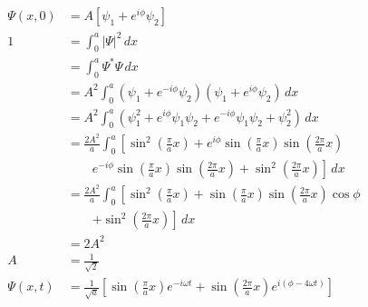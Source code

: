 \documentclass{article}
\begin{document}
\begin{align*}
  \Psi(x, 0) & = A [\psi_1 + e^{i \phi} \psi_2]                                                                                                                                       \\
  1          & = \int_0^a |\Psi|^2 \,d x                                                                                                                                              \\
             & = \int_0^a \Psi^* \Psi \,d x                                                                                                                                           \\
             & = A^2 \int_0^a (\psi_1 + e^{-i \phi} \psi_2) (\psi_1 + e^{i \phi} \psi_2) \,d x                                                                                        \\
             & = A^2 \int_0^a (\psi_1^2 + e^{i \phi} \psi_1 \psi_2 + e^{-i \phi} \psi_1 \psi_2 + \psi_2^2) \,d x                                                                      \\
             & = \frac{2 A^2}{a} \int_0^a \left[ \sin^2 \left( \frac{\pi}{a} x \right) + e^{i \phi} \sin \left( \frac{\pi}{a} x \right) \sin \left( \frac{2 \pi}{a} x \right) \right. \\
             & \qquad \left. e^{-i \phi} \sin \left( \frac{\pi}{a} x \right) \sin \left( \frac{2 \pi}{a} x \right) + \sin^2 \left( \frac{2 \pi}{a} x \right) \right] \,d x            \\
             & = \frac{2 A^2}{a} \int_0^a \left[ \sin^2 \left( \frac{\pi}{a} x \right) + \sin \left( \frac{\pi}{a} x \right) \sin \left( \frac{2 \pi}{a} x \right) \cos \phi \right.  \\
             & \qquad \left. + \sin^2 \left( \frac{2 \pi}{a} x \right) \right] \,d x                                                                                                  \\
             & = 2 A^2                                                                                                                                                                \\
  A          & = \frac{1}{\sqrt{2}}                                                                                                                                                   \\
  \Psi(x, t) & = \frac{1}{\sqrt{a}} \left[ \sin \left( \frac{\pi}{a} x \right) e^{-i \omega t} + \sin \left( \frac{2 \pi}{a} x \right) e^{i (\phi - 4 \omega t)} \right]
\end{align*}
\end{document}
